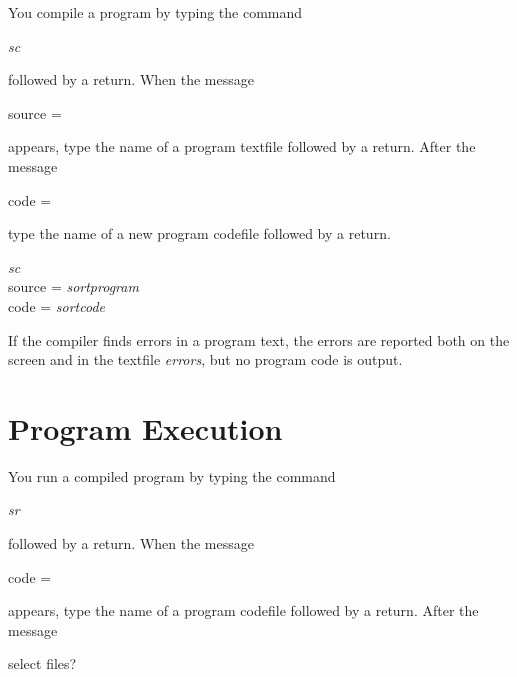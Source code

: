 You compile a {\Superpascal} program by typing the command

\begin{center}
  {\it sc}
\end{center}

\noindent
followed by a return. When the message

\begin{center}
  source =
\end{center}

\noindent
appears, type the name of a program textfile followed by a
return. After the message

\begin{center}
  code =
\end{center}

\noindent
type the name of a new program codefile followed by a
return.

\blankline

\example

\begin{program}{10.5em}
  {\PA}{\it sc}                    \\
    {\PB}source = {\it sortprogram}\\
    {\PB}code = {\it sortcode}     \\
\end{program}

If the compiler finds errors in a program text, the errors
are reported both on the screen and in the textfile {\it
errors}, but no program code is output.


\section{Program Execution}

You run a compiled {\Superpascal} program by typing the
command

\begin{center}
  {\it sr}
\end{center}

\noindent
followed by a return. When the message

\begin{center}
  code =
\end{center}

\noindent
appears, type the name of a program codefile followed by a
return. After the message

\begin{center}
  select files?
\end{center}

